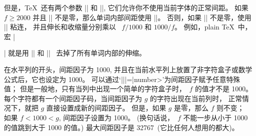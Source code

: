 \ddanger 但是，\TeX\ 还有两个参数 |\spaceskip| 和 |\xspaceskip|,
它们允许你不使用当前字体的正常间距。
如果 $f\ge2000$ 并且 |\xspaceskip| 不是零，那么单词内部间距使用 |\xspaceskip|。
否则，如果 |\spaceskip| 不是零，使用 |\spaceskip| 粘连，
并且伸长和收缩量分别乘以 ~$f/1000$ 和 $1000/f$。
例如，plain \TeX\ 中，宏 |\raggedright| 就是用 |\spaceskip| 和 |\xspaceskip|~%
去掉了所有单词内部的伸缩。

\ddanger 在水平列的开头，间距因子为 1000,
并且在当前水平列上放置了非字符盒子或数学公式后，它也设定为 1000。%
可以通过`|\spacefactor||=|\<number>'为间距因子赋予任意特殊值；
但是一般地，只有当列中出现一个简单的字符盒子时，~$f$ 的值才不是 1000。%
每个字符都有一个间距因子码，当间距因子为 $g$ 的字符出现在当前列时，
正常情况下，就把 $g$ 直接设置成新的间距因子。%
但是，如果 $g$ 是零，那么 $f$ 则不变；
如果 $f<1000<g$, 间距因子设置为 1000。%
(换句话说，~$f$ 不能一步从小于 1000 的值跳到大于 1000 的\hbox{值。)}
最大间距因子是 32767~(它比任何人想用的都大)。

